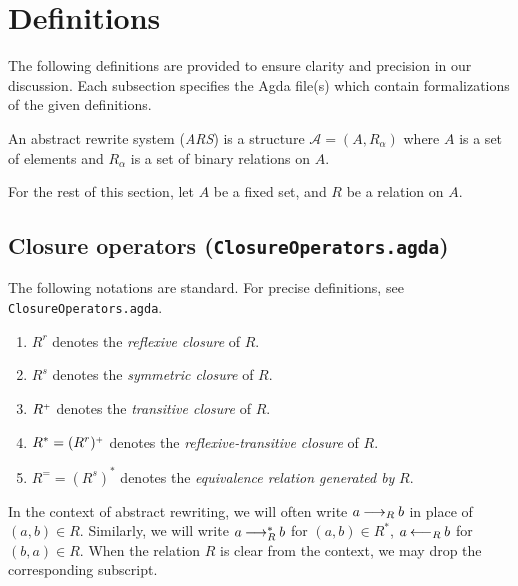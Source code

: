 \section{Definitions}
\label{sec:Definitions}
The following definitions are provided to ensure clarity and precision
in our discussion. Each subsection specifies the Agda file(s) which contain formalizations of the given definitions.

\begin{definition}
    An abstract rewrite system (\emph{ARS}) is a structure $\mathcal{A} = (A, R_\alpha)$ where
     $A$ is a set of elements and $R_\alpha$ is a set of binary relations on $A$.
\end{definition}

For the rest of this section, let $A$ be a fixed set, and $R$ be a relation on $A$.



\subsection{Closure operators (\texttt{ClosureOperators.agda})}

\begin{notation} \hfill
The following notations are standard.  For precise definitions, see \texttt{ClosureOperators.agda}.
  \begin{enumerate}
    \item $R^r$ denotes the \emph{reflexive closure} of $R$.
    \item $R^s$ denotes the \emph{symmetric closure} of $R$.
    \item ${R}^{\scriptscriptstyle{+}}$ denotes the \emph{transitive closure} of $R$.
    \item $R^* = (R^r){}^{\scriptscriptstyle{+}}$ denotes the \emph{reflexive-transitive closure} of $R$.
    \item $R^= = (R^s)^*$ denotes the \emph{equivalence relation generated by} $R$.
  \end{enumerate}
\end{notation}




In the context of abstract rewriting, we will often write $a \mathbin{\longrightarrow_R} b$
in place of $(a,b) \in R$.  Similarly, we will write $a \mathbin{\longrightarrow_R^*} b$ for $(a,b) \in R^*$,
$a \mathbin{\longleftarrow_R} b$ for $(b,a) \in R$.  When the relation $R$ is clear from the context,
we may drop the corresponding subscript.

